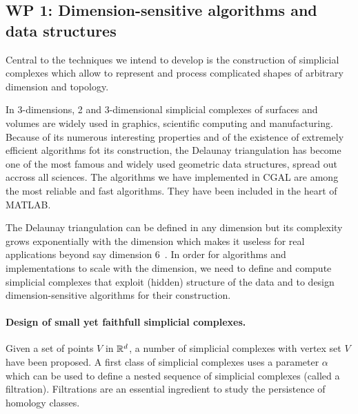 \subsection*{WP 1:  Dimension-sensitive algorithms and data structures} 

Central to the techniques we intend to develop is the construction of simplicial complexes which
allow to represent and process complicated shapes of arbitrary dimension and topology.

In 3-dimensions, 2 and 3-dimensional simplicial complexes of surfaces and volumes are widely used in graphics, scientific computing and manufacturing. Because of its numerous interesting properties and of the existence of extremely efficient algorithms fot its construction, the Delaunay triangulation has become one of the most famous and widely used geometric data structures, spread out accross all sciences. The algorithms we have implemented in CGAL are among the most reliable and fast algorithms. They have been included in the heart of MATLAB. 

The Delaunay triangulation can be defined in any dimension but its complexity grows exponentially with the dimension which makes it useless for real applications beyond say dimension 6~\cite{avis,hornus}.  In order for algorithms and implementations to scale with the dimension, we need to define and compute simplicial complexes that exploit (hidden) structure of the data and to design dimension-sensitive algorithms for their construction.


\paragraph{Design of small yet faithfull simplicial complexes.} 
Given a set of points $V$ in $\mathbb R ^d$, a number of simplicial complexes with vertex set $V$ have been proposed. A first class of simplicial complexes uses a parameter $\alpha$ which can be used to define a nested sequence of simplicial complexes (called a filtration). Filtrations are an essential ingredient to study the persistence of homology classes. 

